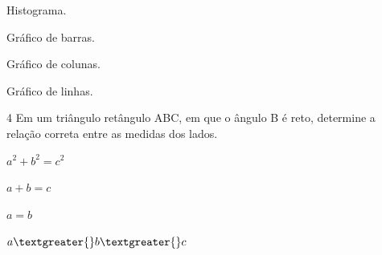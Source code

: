 \begin{escolha}
\item
  Histograma.
\item
  Gráfico de barras.
\item
  Gráfico de colunas.
\item
  Gráfico de linhas.
\end{escolha}







\num{4} Em um triângulo retângulo ABC, em que o ângulo B é reto, determine a
relação correta entre as medidas dos lados.

\begin{escolha}
\item $a^2 + b^2 = c^2$
\item $a + b = c$
\item $a = b$
\item $a \textgreater{} b \textgreater{} c$
\end{escolha}




